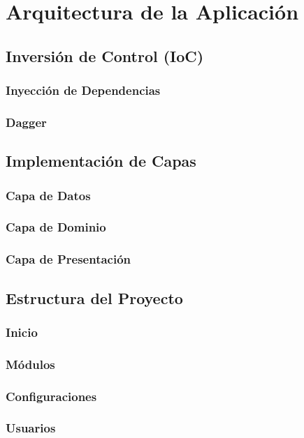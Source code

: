 
\chapter{Arquitectura de la Aplicación} %

\label{Chapter5} %

\section{Inversión de Control (IoC)}
\subsection{Inyección de Dependencias}
\subsection{Dagger}
\section{Implementación de Capas}
\subsection{Capa de Datos}
\subsection{Capa de Dominio}
\subsection{Capa de Presentación}
\section{Estructura del Proyecto}
\subsection{Inicio}
\subsection{Módulos}
\subsection{Configuraciones}
\subsection{Usuarios}


